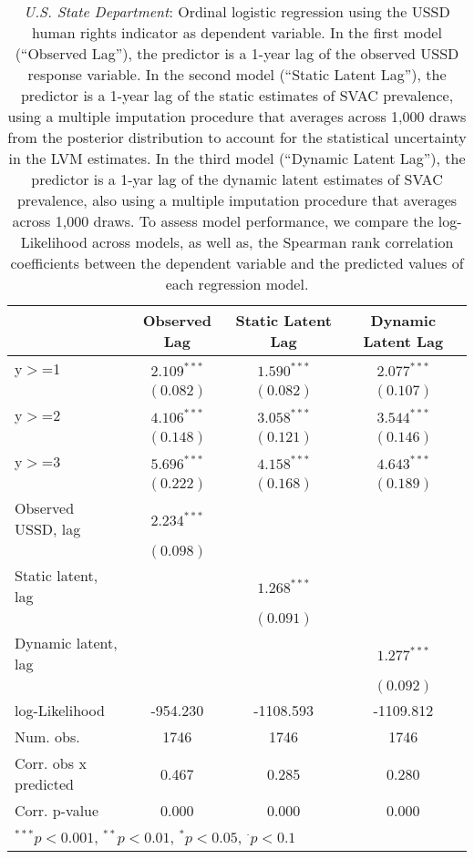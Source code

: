 
\begin{table}[h]
\begin{center}
\begin{tabular}{l c c c }
\hline
 & Observed Lag & Static Latent Lag & Dynamic Latent Lag \\
\hline
y$>$=1                & $2.109^{***}$ & $1.590^{***}$ & $2.077^{***}$ \\
                      & $(0.082)$     & $(0.082)$     & $(0.107)$     \\
y$>$=2                & $4.106^{***}$ & $3.058^{***}$ & $3.544^{***}$ \\
                      & $(0.148)$     & $(0.121)$     & $(0.146)$     \\
y$>$=3                & $5.696^{***}$ & $4.158^{***}$ & $4.643^{***}$ \\
                      & $(0.222)$     & $(0.168)$     & $(0.189)$     \\
Observed USSD, lag    & $2.234^{***}$ &               &               \\
                      & $(0.098)$     &               &               \\
Static  latent, lag   &               & $1.268^{***}$ &               \\
                      &               & $(0.091)$     &               \\
Dynamic latent, lag   &               &               & $1.277^{***}$ \\
                      &               &               & $(0.092)$     \\
\hline
log-Likelihood        & -954.230      & -1108.593     & -1109.812     \\
Num. obs.             & 1746          & 1746          & 1746          \\
Corr. obs x predicted & 0.467         & 0.285         & 0.280         \\
Corr. p-value         & 0.000         & 0.000         & 0.000         \\
\hline
\multicolumn{4}{l}{\scriptsize{$^{***}p<0.001$, $^{**}p<0.01$, $^*p<0.05$, $^{\cdot}p<0.1$}}
\end{tabular}
\caption{\emph{U.S. State Department}: Ordinal logistic regression using the USSD human rights 
       indicator as dependent variable. In the first model (``Observed Lag''), the predictor is a 1-year lag
       of the observed USSD response variable. In the second model (``Static Latent Lag''), the predictor is a 1-year
       lag of the static estimates of SVAC prevalence, using a multiple imputation procedure that averages across 1,000 draws
        from the posterior distribution to account for the statistical uncertainty in the LVM estimates. 
       In the third model (``Dynamic Latent Lag''), the predictor is a 1-yar lag of the dynamic latent 
       estimates of SVAC prevalence, also using a multiple imputation procedure that averages across 1,000 draws. To assess
       model performance, we compare the log-Likelihood across models, as well as, the Spearman rank
       correlation coefficients between the dependent variable and the predicted values of each regression
       model.}
\label{xt-state}
\end{center}
\end{table}
